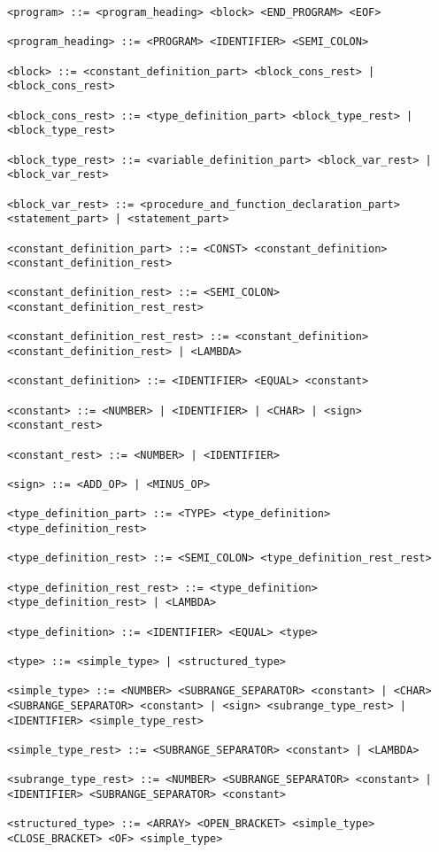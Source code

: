 \documentclass[a4paper,oneside]{report}
\begin{document}
\begin{verbatim}
<program> ::= <program_heading> <block> <END_PROGRAM> <EOF>

<program_heading> ::= <PROGRAM> <IDENTIFIER> <SEMI_COLON>

<block> ::= <constant_definition_part> <block_cons_rest> | <block_cons_rest>

<block_cons_rest> ::= <type_definition_part> <block_type_rest> | <block_type_rest>

<block_type_rest> ::= <variable_definition_part> <block_var_rest> | <block_var_rest>

<block_var_rest> ::= <procedure_and_function_declaration_part> <statement_part> | <statement_part>

<constant_definition_part> ::= <CONST> <constant_definition> <constant_definition_rest>

<constant_definition_rest> ::= <SEMI_COLON> <constant_definition_rest_rest>

<constant_definition_rest_rest> ::= <constant_definition> <constant_definition_rest> | <LAMBDA>

<constant_definition> ::= <IDENTIFIER> <EQUAL> <constant>

<constant> ::= <NUMBER> | <IDENTIFIER> | <CHAR> | <sign> <constant_rest>

<constant_rest> ::= <NUMBER> | <IDENTIFIER>

<sign> ::= <ADD_OP> | <MINUS_OP>

<type_definition_part> ::= <TYPE> <type_definition> <type_definition_rest>

<type_definition_rest> ::= <SEMI_COLON> <type_definition_rest_rest>

<type_definition_rest_rest> ::= <type_definition> <type_definition_rest> | <LAMBDA>

<type_definition> ::= <IDENTIFIER> <EQUAL> <type>

<type> ::= <simple_type> | <structured_type>

<simple_type> ::= <NUMBER> <SUBRANGE_SEPARATOR> <constant> | <CHAR> <SUBRANGE_SEPARATOR> <constant> | <sign> <subrange_type_rest> | <IDENTIFIER> <simple_type_rest>

<simple_type_rest> ::= <SUBRANGE_SEPARATOR> <constant> | <LAMBDA>

<subrange_type_rest> ::= <NUMBER> <SUBRANGE_SEPARATOR> <constant> | <IDENTIFIER> <SUBRANGE_SEPARATOR> <constant>

<structured_type> ::= <ARRAY> <OPEN_BRACKET> <simple_type> <CLOSE_BRACKET> <OF> <simple_type>


\end{verbatim}
\end{document}
